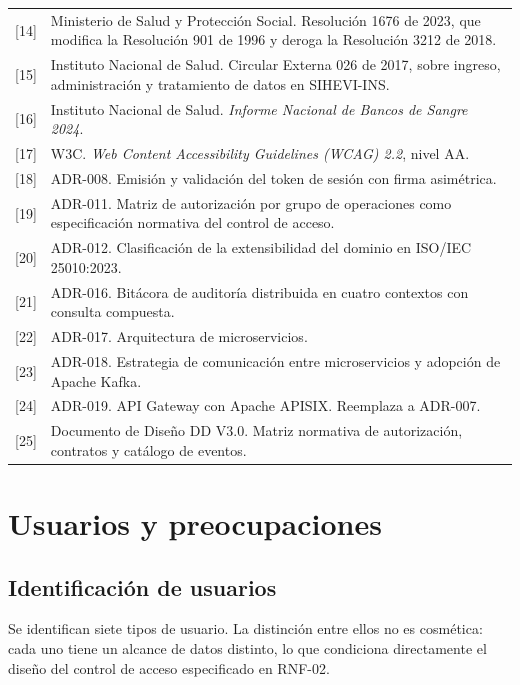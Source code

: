 \documentclass[11pt,a4paper]{article}
\begin{document}
\begin{longtable}{L{1.3cm} L{13.3cm}}
{[}14{]} & Ministerio de Salud y Protección Social. Resolución 1676 de 2023, que modifica la Resolución 901 de 1996 y deroga la Resolución 3212 de 2018. \\
{[}15{]} & Instituto Nacional de Salud. Circular Externa 026 de 2017, sobre ingreso, administración y tratamiento de datos en SIHEVI-INS. \\
{[}16{]} & Instituto Nacional de Salud. \emph{Informe Nacional de Bancos de Sangre 2024}. \\
{[}17{]} & W3C. \emph{Web Content Accessibility Guidelines (WCAG) 2.2}, nivel AA. \\
{[}18{]} & ADR-008. Emisión y validación del token de sesión con firma asimétrica. \\
{[}19{]} & ADR-011. Matriz de autorización por grupo de operaciones como especificación normativa del control de acceso. \\
{[}20{]} & ADR-012. Clasificación de la extensibilidad del dominio en ISO/IEC 25010:2023. \\
{[}21{]} & ADR-016. Bitácora de auditoría distribuida en cuatro contextos con consulta compuesta. \\
{[}22{]} & ADR-017. Arquitectura de microservicios. \\
{[}23{]} & ADR-018. Estrategia de comunicación entre microservicios y adopción de Apache Kafka. \\
{[}24{]} & ADR-019. API Gateway con Apache APISIX. Reemplaza a ADR-007. \\
{[}25{]} & Documento de Diseño DD V3.0. Matriz normativa de autorización, contratos y catálogo de eventos. \\
\end{longtable}

\section{Usuarios y preocupaciones}

\subsection{Identificación de usuarios}

Se identifican siete tipos de usuario. La distinción entre ellos no es cosmética: cada uno tiene un alcance de datos distinto, lo que condiciona directamente el diseño del control de acceso especificado en RNF-02.
\end{document}
